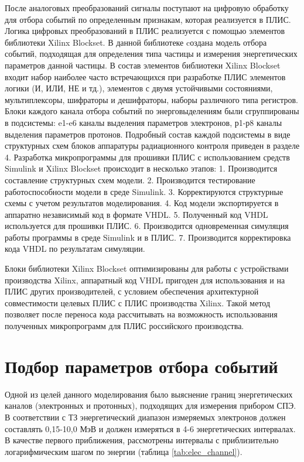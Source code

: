 После аналоговых преобразований сигналы поступают на цифровую обработку для отбора событий по определенным признакам, которая реализуется в ПЛИС. Логика цифровых преобразований в ПЛИС  реализуется с помощью элементов библиотеки Xilinx Blockset. В данной библиотеке cоздана модель отбора событий, подходящая для определения типа частицы и измерения энергетических параметров данной частицы. В состав элементов библиотеки Xilinx Blockset входит набор наиболее часто встречающихся при разработке ПЛИС элементов логики (И, ИЛИ, НЕ и тд.), элементов с двумя устойчивыми состояниями, мультиплексоры, шифраторы и дешифраторы, наборы различного типа регистров. Блоки каждого канала отбора событий по энерговыделениям были сгруппированы в подсистемы:
e1-e6 каналы выделения параметров электронов, 
р1-р8 каналы выделения параметров протонов. 
Подробный состав каждой подсистемы в виде структурных схем блоков аппаратуры радиационного контроля приведен в разделе 4.
Разработка микропрограммы для прошивки ПЛИС с использованием средств Simulink и Xilinx Blockset происходит в несколько этапов:
1.	Производится составление структурных схем модели.
2.	Производится тестирование работоспособности модели в среде Simulink.
3.	Корректируются структурные схемы с учетом результатов моделирования.
4.	Код модели экспортируется в аппаратно независимый код в формате VHDL.
5.	Полученный код VHDL используется для прошивки ПЛИС.
6.	Производится одновременная симуляция работы программы в среде Simulink и в ПЛИС.
7.	Производится корректировка кода VHDL по результатам симуляции.

Блоки библиотеки Xilinx Blockset оптимизированы для работы с устройствами производства Xilinx, аппаратный код VHDL пригоден для использования и на ПЛИС других производителей, с условием обеспечения архитектурной совместимости целевых ПЛИС с ПЛИС производства Xilinx. Такой метод позволяет после переноса кода рассчитывать на возможность использования полученных микропрограмм для ПЛИС российского производства.


\section{Подбор параметров отбора событий}

Одной из целей данного моделирования было выяснение границ энергетических каналов (электронных и протонных), подходящих для измерения прибором СПЭ. В соответствии с ТЗ энергетический диапазон измеряемых электронов должен составлять 0,15-10,0 МэВ и должен измеряться в 4-6 энергетических интервалах. В качестве первого приближения, рассмотрены интервалы с приблизительно логарифмическим шагом по энергии (таблица \ref{tab:elec_channel}).

